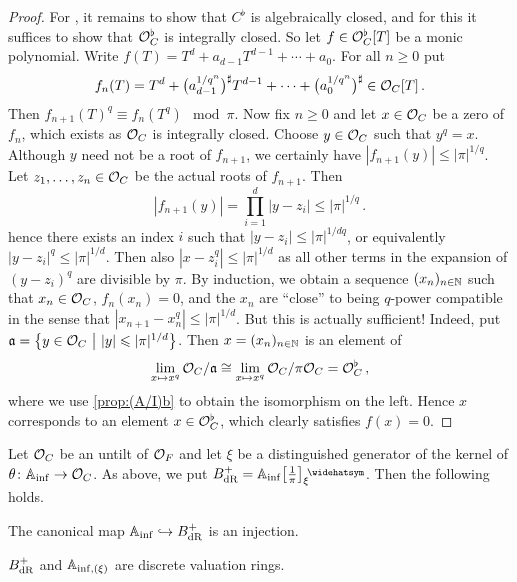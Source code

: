 \begin{proof}
	
	For , it remains to show that $C^\flat$ is algebraically closed, and for this it suffices to show that $\mathcal{O}_C^\flat$ is integrally closed. So let $f\in \mathcal{O}_C^\flat[T]$ be a monic polynomial. Write $f(T)=T^d+a_{d-1}T^{d-1}+\dotsb+a_0$. For all $n\geq 0$ put
	\begin{equation*}
		f_n(T)=T^d+\big(a_{d-1}^{1/q^n}\big)^\sharp T^{d-1}+\dotsb+\big(a_0^{1/q^n}\big)^\sharp\in \mathcal{O}_C[T]\,.
	\end{equation*}
	Then $f_{n+1}(T)^q\equiv f_n(T^q)\mod \pi$. Now fix $n\geq 0$ and let $x\in \mathcal{O}_C$ be a zero of $f_n$, which exists as $\mathcal{O}_C$ is integrally closed. Choose $y\in \mathcal{O}_C$ such that $y^q=x$. Although $y$ need not be a root of $f_{n+1}$, we certainly have $|f_{n+1}(y)|\leq |\pi|^{1/q}$. Let $z_1,\dotsc,z_n\in \mathcal{O}_C$ be the actual roots of $f_{n+1}$. Then
	\begin{equation*}
		|f_{n+1}(y)|=\prod_{i=1}^d|y-z_i|\leq |\pi|^{1/q}\,.
	\end{equation*}
	hence there exists an index $i$ such that $|y-z_i|\leq |\pi|^{1/dq}$, or equivalently $|y-z_i|^q\leq |\pi|^{1/d}$. Then also $|x-z_i^q|\leq |\pi|^{1/d}$ as all other terms in the expansion of $(y-z_i)^q$ are divisible by $\pi$. By induction, we obtain a sequence $(x_n)_{n\in \mathbb{N}}$ such that $x_n\in\mathcal{O}_C$, $f_n(x_n)=0$, and the $x_n$ are \enquote{close} to being $q$-power compatible in the sense that $|x_{n+1}-x_n^q|\leq |\pi|^{1/d}$. But this is actually sufficient! Indeed, put $\mathfrak{a}=\left\{y\in \mathcal{O}_C\ \middle|\  |y|\leqslant |\pi|^{1/d}\right\}$. Then $x=(x_n)_{n\in\mathbb{N}}$ is an element of
	\begin{equation*}
		\operatorname*{lim}_{x\mapsto x^q}\mathcal{O}_C/\mathfrak{a}\cong \operatorname*{lim}_{x\mapsto x^q}\mathcal{O}_C/\pi\mathcal{O}_C=\mathcal{O}_C^\flat\,,
	\end{equation*}
	where we use \cref{prop:(A/I)b} to obtain the isomorphism on the left. Hence $x$ corresponds to an element $x\in \mathcal{O}_C^\flat$, which clearly satisfies $f(x)=0$.
\end{proof}
\begin{lem}\label{lem:BdR+DVR}
	Let $\mathcal{O}_C$ be an untilt of $\mathcal{O}_F$ and let $\xi$ be a distinguished generator of the kernel of $\theta\colon \IA_\inf\morphism\Oo_C$. As above, we put $B_\dR^+=\IA_\inf\localize{\pi}_\xi^\complete$. Then the following holds.
	\begin{numerate}
		\item The canonical map $\IA_\inf\monomorphism B_\dR^+$ is an injection.
		\item $B_{\mathrm{dR}}^+$ and $\mathbb{A}_{\mathrm{inf},(\xi)}$ are discrete valuation rings.
	\end{numerate}
\end{lem}
